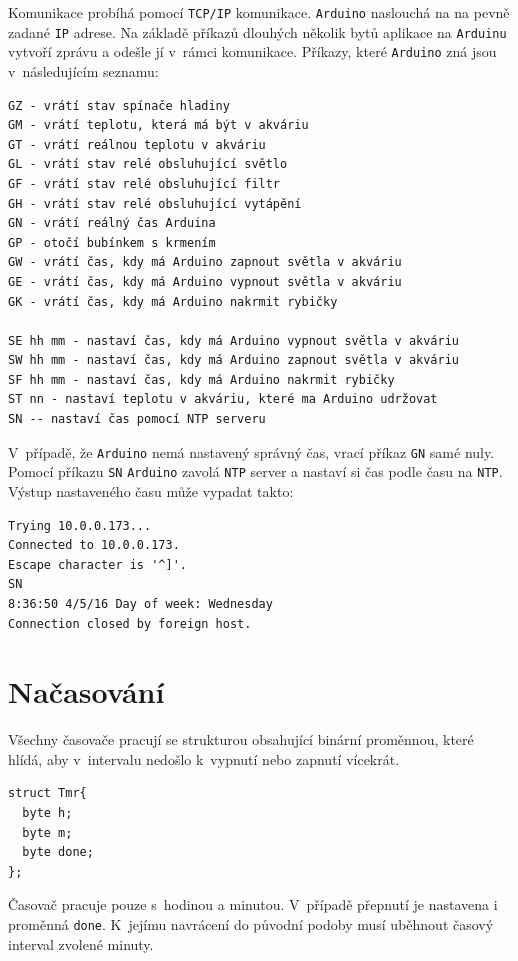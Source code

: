 \documentclass[a4paper,10pt]{article}
\newcommand{\ttt}[1]{\texttt{#1}}
\begin{document}
Komunikace probíhá pomocí \ttt{TCP/IP} komunikace. \ttt{Arduino} naslouchá na na pevně zadané \ttt{IP} adrese. Na základě příkazů dlouhých několik bytů aplikace na \ttt{Arduinu} vytvoří zprávu a odešle jí v~rámci komunikace. Příkazy, které \ttt{Arduino} zná jsou v~následujícím seznamu:

\begin{verbatim}
GZ - vrátí stav spínače hladiny
GM - vrátí teplotu, která má být v akváriu
GT - vrátí reálnou teplotu v akváriu
GL - vrátí stav relé obsluhující světlo
GF - vrátí stav relé obsluhující filtr
GH - vrátí stav relé obsluhující vytápění
GN - vrátí reálný čas Arduina
GP - otočí bubínkem s krmením
GW - vrátí čas, kdy má Arduino zapnout světla v akváriu
GE - vrátí čas, kdy má Arduino vypnout světla v akváriu
GK - vrátí čas, kdy má Arduino nakrmit rybičky

SE hh mm - nastaví čas, kdy má Arduino vypnout světla v akváriu
SW hh mm - nastaví čas, kdy má Arduino zapnout světla v akváriu
SF hh mm - nastaví čas, kdy má Arduino nakrmit rybičky
ST nn - nastaví teplotu v akváriu, které ma Arduino udržovat
SN -- nastaví čas pomocí NTP serveru
\end{verbatim}

V~případě, že \ttt{Arduino} nemá nastavený správný čas, vrací příkaz \ttt{GN} samé nuly. Pomocí příkazu \ttt{SN} \ttt{Arduino} zavolá \ttt{NTP} server a nastaví si čas podle času na \ttt{NTP}. Výstup nastaveného času může vypadat takto:

\begin{verbatim}
Trying 10.0.0.173...
Connected to 10.0.0.173.
Escape character is '^]'.
SN
8:36:50 4/5/16 Day of week: Wednesday
Connection closed by foreign host.
\end{verbatim}

\section{Načasování}

Všechny časovače pracují se strukturou obsahující binární proměnnou, které hlídá, aby v~intervalu nedošlo k~vypnutí nebo zapnutí vícekrát. 

\begin{verbatim}
struct Tmr{
  byte h;
  byte m;
  byte done;
};
\end{verbatim}

Časovač pracuje pouze s~hodinou a minutou. V~případě přepnutí je nastavena i proměnná \ttt{done}. K~jejímu navrácení do původní podoby musí uběhnout časový interval zvolené minuty.
\end{document}
